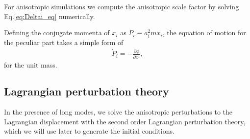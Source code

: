 \documentclass[a4paper,11pt]{article}
\begin{document}
For anisotropic simulations we compute the anisotropic scale factor
by solving Eq.\eqref{eq:Deltai_eq} numerically.

Defining the conjugate momenta of $x_{i}$ as $P_{i}\equiv a_i^2 m \dot x_{i}$,
the equation of motion for the peculiar part takes a simple form of
\begin{align}
    \dot P_{i} = - \frac{\partial \phi}{\partial x^i},
    \label{eq:mod_EoM}
\end{align}
for the unit mass.



\subsection{Lagrangian perturbation theory}
\label{sub:lpt}

In the presence of long modes, we solve the anisotropic perturbations to the
Lagrangian displacement with the second order Lagrangian perturbation theory,
which we will use later to generate the initial conditions.
\end{document}
